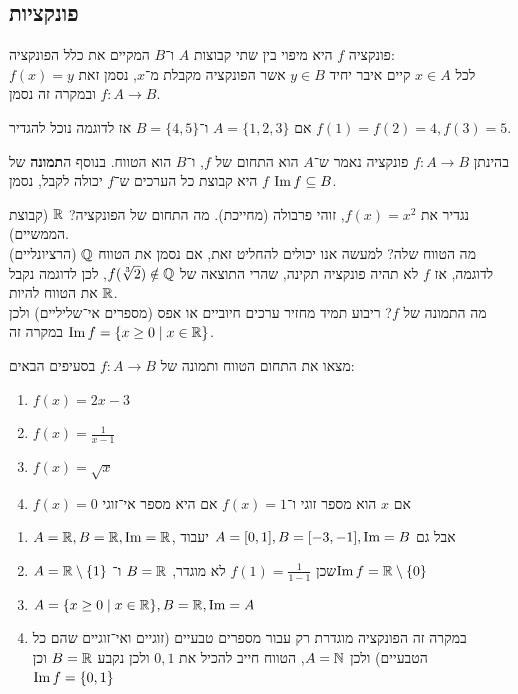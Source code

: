 \subsection{פונקציות}
\begin{definition}[פונקציה]
	פונקציה $f$ היא מיפוי בין שתי קבוצות $A$ ו־$B$ המקיים את כלל הפונקציה: \\
	לכל $x \in A$ קיים איבר יחיד $y \in B$ אשר הפונקציה מקבלת מ־$x$, נסמן זאת $f(x) = y$ ובמקרה זה נסמן $f : A \to B$.
\end{definition}
\begin{example}
	אם $A = \{1, 2, 3\}$ ו־$B = \{4, 5\}$ אז לדוגמה נוכל להגדיר $f(1) = f(2) = 4, f(3) = 5$.
\end{example}
\begin{definition}
	בהינתן $f : A \to B$ פונקציה נאמר ש־$A$ הוא התחום של $f$, ו־$B$ הוא הטווח.
	בנוסף ה\textbf{תמונה} של $f$ היא קבוצת כל הערכים ש־$f$ יכולה לקבל, נסמן $\operatorname{Im} f \subseteq B$.
\end{definition}
\begin{example}
	נגדיר את $f(x) = x^2$, זוהי פרבולה (מחייכת).
	מה התחום של הפונקציה? $\mathbb{R}$ (קבוצת הממשיים). \\
	מה הטווח שלה? למעשה אנו יכולים להחליט זאת, אם נסמן את הטווח $\mathbb{Q}$ (הרציונליים) לדוגמה, אז $f$ לא תהיה פונקציה תקינה, שהרי התוצאה של $f(\sqrt[3]{2}) \notin \mathbb{Q}$, לכן לדוגמה נקבל את הטווח להיות $\mathbb{R}$. \\
	מה התמונה של $f$? ריבוע תמיד מחזיר ערכים חיוביים או אפס (מספרים אי־שליליים) ולכן במקרה זה $\operatorname{Im} f = \{ x \ge 0 \mid x \in \mathbb{R} \}$.
\end{example}
\begin{exercise}
	מצאו את התחום הטווח ותמונה של $f : A \to B$ בסעיפים הבאים:
	\begin{enumerate}
		\item $f(x) = 2x - 3$
		\item $f(x) = \frac{1}{x - 1}$
		\item $f(x) = \sqrt{x}$
		\item $f(x) = 0$ אם $x$ הוא מספר זוגי ו־$f(x) = 1$ אם היא מספר אי־זוגי
	\end{enumerate}
\end{exercise}
\begin{solution}
	\begin{enumerate}
		\item $A = \mathbb{R}, B = \mathbb{R}, \operatorname{Im} = \mathbb{R}$, אבל גם $A = [0, 1], B = [-3, -1], \operatorname{Im} = B$ יעבוד
		\item $A = \mathbb{R} \setminus \{ 1 \}$ שכן $f(1) = \frac{1}{1 - 1}$ לא מוגדר, $B = \mathbb{R}$ ו־$\operatorname{Im} f = \mathbb{R} \setminus \{ 0 \}$
		\item $A = \{ x \ge 0 \mid x \in \mathbb{R} \}, B = \mathbb{R}, \operatorname{Im} = A$
		\item במקרה זה הפונקציה מוגדרת רק עבור מספרים טבעיים (זוגיים ואי־זוגיים שהם כל הטבעיים) ולכן $A = \mathbb{N}$, הטווח חייב להכיל את $0, 1$ ולכן נקבע $B = \mathbb{R}$ וכן $\operatorname{Im} f = \{ 0, 1 \}$
	\end{enumerate}
\end{solution}



